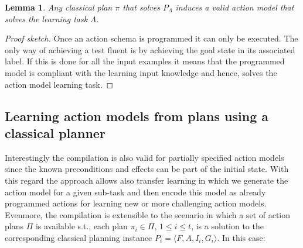 \documentclass[letterpaper]{article} %
\newcommand{\tup}[1]{{\langle #1 \rangle}}
\newtheorem{lemma}[theorem]{Lemma}
\begin{document}
\begin{lemma}
Any classical plan $\pi$ that solves $P_{\Lambda}$ induces a valid action model that solves the learning task $\Lambda$.
\end{lemma}

\begin{proof}[Proof sketch]
Once an action schema is programmed it can only be executed. The only way of achieving a test fluent is by achieving the goal state in its associated label. If this is done for all the input examples it means that the programmed model is compliant with the learning input knowledge and hence, solves the action model learning task.
\end{proof}

\subsection{Learning action models from plans using a classical planner}
Interestingly the compilation is also valid for partially specified action models since the known preconditions and effects can be part of the initial state. With this regard the approach allows also transfer learning in which we generate the action model for a given sub-task and then encode this model as already programmed actions for learning new or more challenging action models. Evenmore, the compilation is extensible to the scenario in which a set of action plans $\Pi$ is available s.t., each plan $\pi_i\in \Pi$, {\small $1\leq i\leq t$}, is a solution to the corresponding classical planning instance $P_i=\tup{F,A,I_i,G_i}$. In this case:
\end{document}
